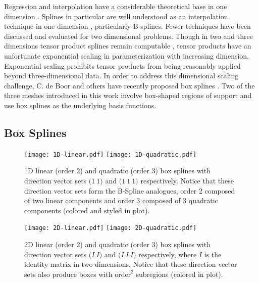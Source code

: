 Regression and interpolation have a considerable theoretical base in one dimension \cite{cheney2009course}. Splines in particular are well understood as an interpolation technique in one dimension \cite{de1978practical}, particularly B-splines. Fewer techniques have been discussed and evaluated for two dimensional problems. Though in two and three dimensions tensor product splines remain computable \cite{unther1996interpolating}, tensor products have an unfortunate exponential scaling in parameterization with increasing dimension. Exponential scaling prohibits tensor products from being reasonably applied beyond three-dimensional data. In order to address this dimensional scaling challenge, C. de Boor and others have recently proposed box splines \cite{de2013box}. Two of the three meshes introduced in this work involve box-shaped regions of support and use box splines as the underlying basis functions.



\subsection{Box Splines}
\label{sec_box_splines}

\begin{figure}
  \texttt{[image: 1D-linear.pdf]}
  \texttt{[image: 1D-quadratic.pdf]}
  \caption{1D linear (order 2) and quadratic (order 3) box splines with direction vector sets $\bigl( 1 \ 1 \bigr)$ and $\bigl( 1 \ 1 \ 1 \bigr)$ respectively. Notice that these direction vector sets form the B-Spline analogues, order 2 composed of two linear components and order 3 composed of 3 quadratic components (colored and styled in plot).}
  \label{fig_1D_boxes}
\end{figure}

\begin{figure}
  \vspace{-.5cm}
  \texttt{[image: 2D-linear.pdf]}
  \texttt{[image: 2D-quadratic.pdf]}
  \caption{2D linear (order 2) and quadratic (order 3) box splines with direction vector sets $\bigl( I \ I \bigr)$ and $\bigl( I \ I \ I \bigr)$ respectively, where $I$ is the identity matrix in two dimensions. Notice that these direction vector sets also produce boxes with $\text{order}^2$ subregions (colored in plot).
  \vspace{-0.1cm}}
  \label{fig_2D_boxes}
\end{figure}

